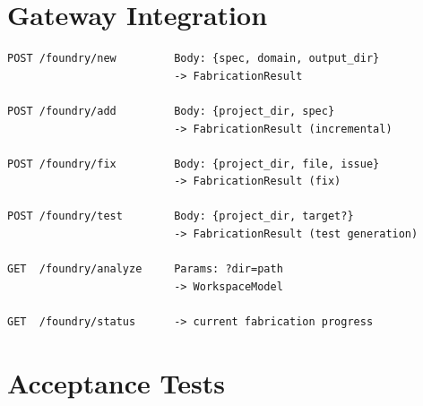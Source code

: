 \documentclass[11pt,a4paper,twoside]{article}
\theoremstyle{definition}
\theoremstyle{plain}
\theoremstyle{remark}
\begin{document}
\part{Gateway Integration}\label{part:gateway}

\begin{lstlisting}[title={New Gateway Endpoints}]
POST /foundry/new         Body: {spec, domain, output_dir}
                          -> FabricationResult

POST /foundry/add         Body: {project_dir, spec}
                          -> FabricationResult (incremental)

POST /foundry/fix         Body: {project_dir, file, issue}
                          -> FabricationResult (fix)

POST /foundry/test        Body: {project_dir, target?}
                          -> FabricationResult (test generation)

GET  /foundry/analyze     Params: ?dir=path
                          -> WorkspaceModel

GET  /foundry/status      -> current fabrication progress
\end{lstlisting}


\part{Acceptance Tests}\label{part:tests}
\end{document}
